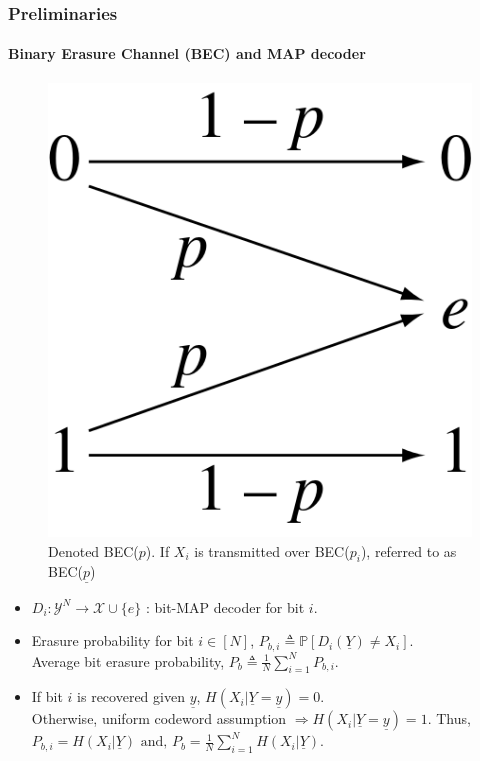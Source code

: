 \documentclass[xcolor=dvipsnames]{beamer}
\begin{document}
\begin{frame}
\frametitle{Preliminaries}
\framesubtitle{Binary Erasure Channel (BEC) and MAP decoder}
\begin{figure}[!htb]
\begin{center}
\includegraphics[scale=0.18]{./figures/bec.png}
\caption{Denoted BEC($p$). If $X_i$ is transmitted over BEC($p_i$), referred to as BEC($\underline{p}$)}
\label{fig:bec}
\end{center}
\end{figure}
\begin{itemize}
\item $D_i : \mathcal{Y}^N \to \mathcal{X} \cup \{e\}$ : bit-MAP decoder for bit $i$.
\item Erasure probability for bit $i \in [N]$, $P_{b,i} \triangleq \mathbb{P}[D_i(\underline{Y}) \neq X_i]$. \\
Average bit erasure probability, $P_b \triangleq \frac{1}{N}\sum_{i=1}^N P_{b,i}$.
\item If bit $i$ is recovered given $\underline{y}$, $H(X_i|\underline{Y}=\underline{y}) = 0$. \\Otherwise, uniform codeword assumption $\Rightarrow H(X_i|\underline{Y}=\underline{y}) = 1$. Thus, $P_{b,i} = H(X_i|\underline{Y}) \text{ and, } P_b = \frac{1}{N}\sum_{i=1}^N  H(X_i|\underline{Y}).$
\end{itemize}
\end{frame}
\end{document}
